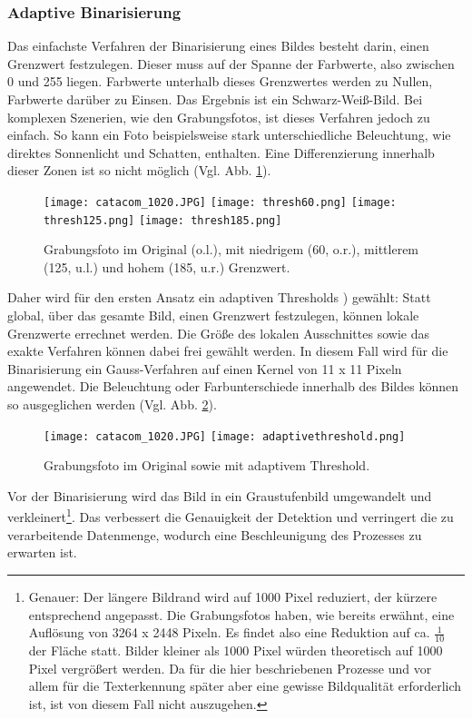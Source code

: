 \subsubsection*{Adaptive Binarisierung}

Das einfachste Verfahren der Binarisierung eines Bildes besteht darin, einen Grenzwert festzulegen. Dieser muss auf der Spanne der Farbwerte, also zwischen 0 und 255 liegen.  Farbwerte unterhalb dieses Grenzwertes werden zu Nullen, Farbwerte darüber zu Einsen. Das Ergebnis ist ein Schwarz-Weiß-Bild. Bei komplexen Szenerien, wie den Grabungsfotos, ist dieses Verfahren jedoch zu einfach. So kann ein Foto beispielsweise stark unterschiedliche Beleuchtung, wie direktes Sonnenlicht und Schatten, enthalten. Eine Differenzierung innerhalb dieser Zonen ist so nicht möglich (Vgl. Abb. \ref{fig:threshold}).\\
\begin{figure}[h!]
\texttt{[image: catacom\_1020.JPG]}
\texttt{[image: thresh60.png]}
\texttt{[image: thresh125.png]}
\texttt{[image: thresh185.png]}
\caption{Grabungsfoto im Original (o.l.), mit niedrigem (60, o.r.), mittlerem (125, u.l.) und hohem (185, u.r.) Grenzwert.}
\label{fig:threshold}
\end{figure}
Daher wird für den ersten Ansatz ein adaptiven Thresholds \cite{opencvadaptivethresholdopencvadaptivethreshold}) gewählt: Statt global, über das gesamte Bild, einen Grenzwert festzulegen, können lokale Grenzwerte errechnet werden. Die Größe des lokalen Ausschnittes sowie das exakte Verfahren können dabei frei gewählt werden. In diesem Fall wird für die Binarisierung ein Gauss-Verfahren auf einen Kernel von 11 x 11 Pixeln angewendet. Die Beleuchtung oder Farbunterschiede innerhalb des Bildes können so ausgeglichen werden (Vgl. Abb. \ref{fig:adaptivethreshold}).
\begin{figure}[h!]
\texttt{[image: catacom\_1020.JPG]}
\texttt{[image: adaptivethreshold.png]}
\caption{Grabungsfoto im Original sowie mit adaptivem Threshold.}
\label{fig:adaptivethreshold}
\end{figure}
Vor der Binarisierung wird das Bild in ein Graustufenbild umgewandelt und verkleinert\footnote{Genauer: Der längere Bildrand wird auf 1000 Pixel reduziert, der kürzere entsprechend angepasst. Die Grabungsfotos haben, wie bereits erwähnt, eine Auflösung von 3264 x 2448 Pixeln. Es findet also eine Reduktion auf ca. $\frac{1}{10}$ der Fläche statt. Bilder kleiner als 1000 Pixel würden theoretisch auf 1000 Pixel vergrößert werden. Da für die hier beschriebenen Prozesse und vor allem für die Texterkennung später aber eine gewisse Bildqualität erforderlich ist, ist von diesem Fall nicht auszugehen.}. Das verbessert die Genauigkeit der Detektion und verringert die zu verarbeitende Datenmenge, wodurch eine Beschleunigung des Prozesses zu erwarten ist. %

